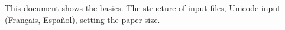 \documentclass[a4paper]{article}
\begin{document}
This document shows the basics.
The structure of input files, Unicode input (Français, Español),
setting the paper size.
\end{document}
